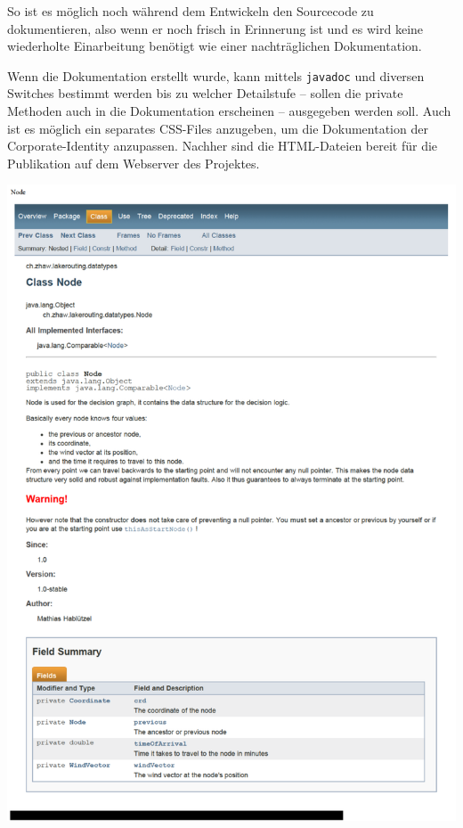\documentclass[a4paper,10pt]{article}
\begin{document}
So ist es möglich noch während dem Entwickeln den Sourcecode zu dokumentieren,
also wenn er noch frisch in Erinnerung ist und es wird keine wiederholte
Einarbeitung benötigt wie einer nachträglichen Dokumentation.

Wenn die Dokumentation erstellt wurde, kann mittels \texttt{javadoc} und
diversen Switches bestimmt werden bis zu welcher Detailstufe -- sollen die
private Methoden auch in die Dokumentation erscheinen -- ausgegeben werden
soll. Auch ist es möglich ein separates CSS-Files anzugeben, um die
Dokumentation der Corporate-Identity anzupassen. Nachher sind die HTML-Dateien
bereit für die Publikation auf dem Webserver des Projektes.

\begin{center}
\begin{minipage}[c]{0.5\linewidth}
 \centering
 \includegraphics[width=\linewidth]{img/javadoc-screenshot.pdf}
\end{minipage}
\end{center}
\end{document}
